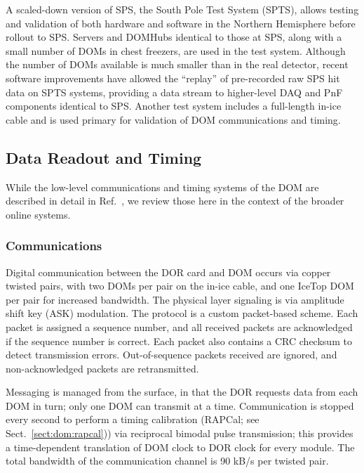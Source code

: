 A scaled-down version of SPS, the South Pole Test System (SPTS), allows
testing and validation of both hardware and software in the Northern
Hemisphere before rollout to SPS.  Servers and DOMHubs identical to those
at SPS, along with a small number of DOMs in chest freezers, are used in
the test system.  Although the number of DOMs available is much smaller
than in the real detector, recent software improvements have allowed the
``replay'' of pre-recorded raw SPS hit data on SPTS systems, providing a data stream to
higher-level DAQ and PnF components identical to SPS.  Another test system
includes a full-length in-ice cable and is used primary for validation of
DOM communications and timing.

\subsection{Data Readout and Timing}

While the low-level communications and timing systems of the DOM are
described in detail in Ref.~\cite{ref:domdaq}, we review those here in the
context of the broader online systems.

\subsubsection{\label{sect:online:comms}Communications}

Digital communication between the DOR card and DOM occurs via copper
twisted pairs, with two DOMs per pair on the in-ice cable, and one IceTop
DOM per pair for increased bandwidth.  The physical
layer signaling is via amplitude shift key (ASK) modulation.  The protocol
is a custom packet-based scheme.  Each packet is assigned a sequence 
number, and all received packets are acknowledged if the sequence number is
correct.  Each packet also contains a CRC checksum to detect transmission
errors.  Out-of-sequence packets received are ignored, and non-acknowledged
packets are retransmitted.  

Messaging is managed from the surface, in that the DOR requests data
from each DOM in turn; only one DOM can transmit at a time.  Communication
is stopped every second to perform a timing calibration (RAPCal; see
Sect.~\ref{sect:dom:rapcal})) via 
reciprocal bimodal pulse transmission; this provides a
time-dependent translation of DOM clock to DOR clock for every module.  The
total bandwidth of the communication channel is 90 kB/s per twisted pair.  


